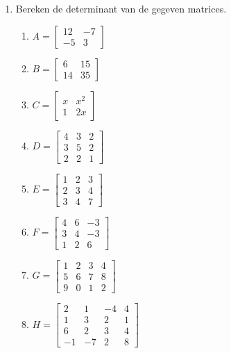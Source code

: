 \begin{enumerate}
\item Bereken de determinant van de gegeven matrices.
\begin{multicols}{3}
\begin{enumerate}
\item $A = \begin{bmatrix}
12 & -7 \\ -5 & 3
\end{bmatrix}$	%

\item $B = \begin{bmatrix}
6 & 15 \\ 14 & 35
\end{bmatrix}$	%

\item $C = \begin{bmatrix}
x & x^2 \\ 1 & 2x
\end{bmatrix}$	%
	
\item $D = \begin{bmatrix}
4       &3 & 2 \\
3       &5 & 2 \\
2       &2 & 1
\end{bmatrix}$

\item $E = \begin{bmatrix}
1       &2 & 3 \\
2       &3 & 4 \\
3       &4 & 7
\end{bmatrix}$

\item $F = \begin{bmatrix}
4 & 6 & -3 \\ 3 & 4 & -3 \\1 & 2 & 6
\end{bmatrix}$	%

\item $G = \begin{bmatrix}
1       &2 & 3 &4 \\
5      &6 & 7 & 8 \\
9       &0 & 1 & 2
\end{bmatrix}$
\item $H = \begin{bmatrix}
2       &1 & -4 &4 \\
1      &3 & 2 & 1 \\
6       &2 & 3 & 4 \\
-1       &-7 & 2 & 8 
\end{bmatrix}$


\end{enumerate}
\end{multicols}
\end{enumerate}
